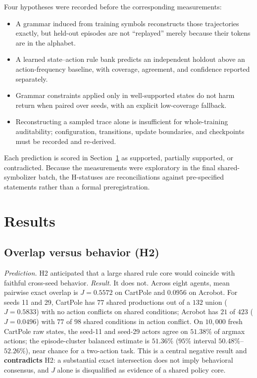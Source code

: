 \documentclass[11pt]{article}
\begin{document}
Four hypotheses were recorded before the corresponding measurements:
\begin{itemize}
\item[\textbf{H1}] A grammar induced from training symbols reconstructs those trajectories exactly,
but held-out episodes are not ``replayed'' merely because their tokens are in the alphabet.
\item[\textbf{H2}] A learned state--action rule bank predicts an independent holdout above an
action-frequency baseline, with coverage, agreement, and confidence reported separately.
\item[\textbf{H3}] Grammar constraints applied only in well-supported states do not harm return
when paired over seeds, with an explicit low-coverage fallback.
\item[\textbf{H4}] Reconstructing a sampled trace alone is insufficient for whole-training
auditability; configuration, transitions, update boundaries, and checkpoints must be recorded and
re-derived.
\end{itemize}
Each prediction is scored in Section~\ref{sec:results} as supported, partially supported, or
contradicted. Because the measurements were exploratory in the final shared-symbolizer batch, the
H-statuses are reconciliations against pre-specified statements rather than a formal
preregistration.

\section{Results}
\label{sec:results}

\subsection{Overlap versus behavior (H2)}
\label{sec:behaviorres}
\emph{Prediction.} H2 anticipated that a large shared rule core would coincide with faithful
cross-seed behavior. \emph{Result.} It does not. Across eight agents, mean pairwise exact overlap
is $J=0.5572$ on CartPole and $0.0956$ on Acrobot. For seeds 11 and 29, CartPole has $77$ shared
productions out of a $132$ union ($J=0.5833$) with no action conflicts on shared conditions;
Acrobot has $21$ of $423$ ($J=0.0496$) with $77$ of $98$ shared conditions in action conflict.
On $10{,}000$ fresh CartPole raw states, the seed-11 and seed-29 actors agree on $51.38\%$ of
argmax actions; the episode-cluster balanced estimate is $51.36\%$ ($95\%$ interval
$50.48\%$--$52.26\%$), near chance for a two-action task. This is a central negative result and
\textbf{contradicts} H2: a substantial exact intersection does not imply behavioral consensus,
and $J$ alone is disqualified as evidence of a shared policy core.
\end{document}
